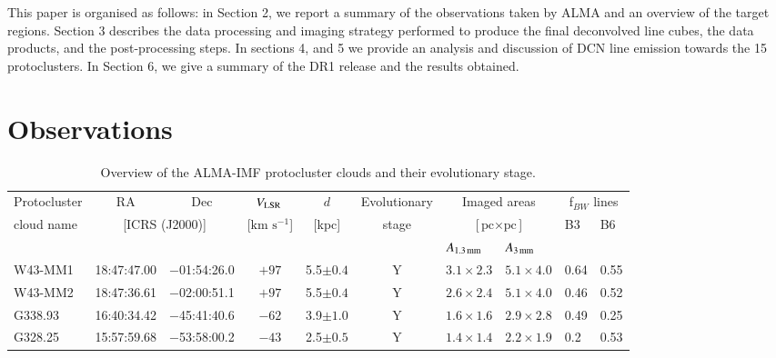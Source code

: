 \documentclass[longauth]{aa} %
\newcommand{\vlsr}{\mbox{$V_{\rm LSR}$\,}}
\newcommand{\pc}{\mbox{pc}}
\newcommand{\kms}{\textrm{km~s}\ensuremath{^{-1}}\xspace}       %
\begin{document}
This paper is organised as follows: in Section 2, we report a summary of the observations taken by ALMA and an overview of the target regions. Section 3 describes the data processing and imaging strategy performed to produce the final deconvolved line cubes, the data products, and the post-processing steps. In sections 4, and 5 we provide an analysis and discussion of DCN line emission towards the 15 protoclusters. In Section 6, we give a summary of the DR1 release and the results obtained.



\section{Observations}
\begin{table}[htp]
\centering
\begin{threeparttable}[c]
\caption{Overview of the ALMA-IMF protocluster clouds and their evolutionary stage.}
\label{tab:sample}
 \begin{tabular}{lcccccllll}
\hline \noalign {\smallskip}
Protocluster  & RA\tnote{1}    & Dec\tnote{1}    & \vlsr\tnote{1} & $d$\tnote{1}   & Evolutionary & \multicolumn{2}{c}{Imaged areas\tnote{3}} & \multicolumn{2}{c}{f$_{BW}$ lines\tnote{4}}\\  
cloud name\tnote{1}    & \multicolumn{2}{c}{[ICRS (J2000)]}   & [$\kms$]      & [kpc]  &  stage\tnote{2}  & \multicolumn{2}{c}{[$\pc \times\pc$]} &B3 & B6\\
&&&&&& $A_{\rm 1.3\,mm}$ & $A_{\rm 3\,mm}$ &\\
\hline \noalign {\smallskip}

W43-MM1     %
    & 18:47:47.00 &  $-$01:54:26.0 & $+97$    & 5.5$\pm 0.4$  %
    & Y &  $3.1\times2.3$       &$5.1 \times 4.0$  & 0.64 & 0.55\\
    
W43-MM2     %
    & 18:47:36.61 & $-$02:00:51.1 & $+97$   & 5.5$\pm 0.4$  %
    & Y & $2.6 \times 2.4$& $5.1 \times 4.0$ & 0.46 & 0.52\\
    
G338.93     %
    & 16:40:34.42 & $-$45:41:40.6 & $-62$   & 3.9$\pm 1.0$ %
    & Y & $1.6 \times 1.6$      & $2.9 \times 2.8$ & 0.49 & 0.25\\      %

G328.25     %
    & 15:57:59.68 & $-$53:58:00.2 & $-43$   & 2.5$\pm 0.5$  %
    & Y & $1.4 \times 1.4$      & $2.2 \times 1.9$ & 0.2 & 0.53\\


\end{tabular}
\end{threeparttable}
\end{table}
\end{document}

